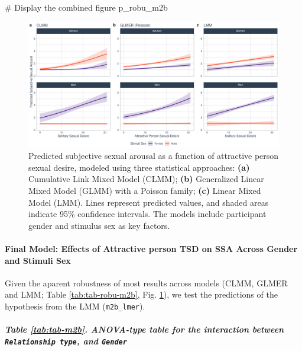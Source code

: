 \documentclass[
  bookmarksnumbered]{article}
\newenvironment{Shaded}{\begin{snugshade}}{\end{snugshade}}
\newcommand{\CommentTok}[1]{\textcolor[rgb]{0.50,0.62,0.50}{#1}}
\newcommand{\NormalTok}[1]{\textcolor[rgb]{0.80,0.80,0.80}{#1}}
\begin{document}
\begin{Shaded}
\begin{Highlighting}[]
\CommentTok{\# Display the combined figure}
\NormalTok{p\_robu\_m2b}
\end{Highlighting}
\end{Shaded}

\begin{figure}
\centering
\includegraphics{Sexual_Desire_Arousal_V2_files/figure-latex/preds-m2b-1.pdf}
\caption{\label{fig:preds-m2b}Predicted subjective sexual arousal as a function of attractive person sexual desire, modeled using three statistical approaches: \textbf{(a)} Cumulative Link Mixed Model (CLMM); \textbf{(b)} Generalized Linear Mixed Model (GLMM) with a Poisson family; \textbf{(c)} Linear Mixed Model (LMM). Lines represent predicted values, and shaded areas indicate 95\% confidence intervals. The models include participant gender and stimulus sex as key factors.}
\end{figure}

\paragraph{Final Model: Effects of Attractive person TSD on SSA Across Gender and Stimuli Sex}\label{final-model-effects-of-attractive-person-tsd-on-ssa-across-gender-and-stimuli-sex}

Given the aparent robustness of most results across models (CLMM, GLMER and LMM; Table \ref{tab:tab-robu-m2b}, Fig. \ref{fig:preds-m2b}), we test the predictions of the hypothesis from the LMM (\texttt{m2b\_lmer}).

\subparagraph{\texorpdfstring{Table \ref{tab:tab-m2b}. ANOVA-type table for the interaction between \texttt{Relationship\ type}, and \texttt{Gender}}{Table \ref{tab:tab-m2b}. ANOVA-type table for the interaction between Relationship type, and Gender}}\label{table-reftabtab-m2b.-anova-type-table-for-the-interaction-between-relationship-type-and-gender}
\end{document}
